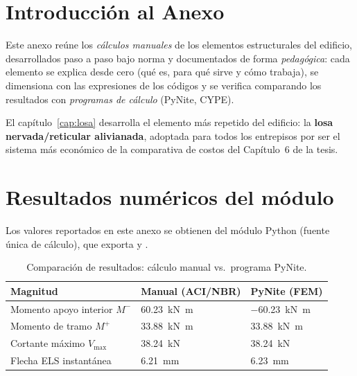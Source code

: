 





\tableofcontents
\listoffigures
\listoftables

\chapter{Introducción al Anexo}
\label{cap:intro}
Este anexo reúne los \emph{cálculos manuales} de los elementos
estructurales del edificio, desarrollados paso a paso bajo norma y
documentados de forma \emph{pedagógica}: cada elemento se explica desde
cero (qué es, para qué sirve y cómo trabaja), se dimensiona con las
expresiones de los códigos y se verifica comparando los resultados con
\emph{programas de cálculo} (PyNite, CYPE).

El capítulo~\ref{cap:losa} desarrolla el elemento más repetido del
edificio: la \textbf{losa nervada/reticular alivianada}, adoptada para
todos los entrepisos por ser el sistema más económico de la comparativa
de costos del Capítulo~6 de la tesis.




\appendix
\chapter{Resultados numéricos del módulo}
\label{cap:resultados}
Los valores reportados en este anexo se obtienen del módulo Python
 (fuente única de cálculo), que exporta
 y .

\begin{table}[H]
\centering
\caption{Comparación de resultados: cálculo manual vs.\ programa PyNite.}
\label{tab:comparacion}
\begin{tabular}{p{4.4cm}C{4.8cm}C{4.8cm}}
\toprule
\textbf{Magnitud} & \textbf{Manual (ACI/NBR)} & \textbf{PyNite (FEM)} \\
\midrule
Momento apoyo interior \(M^{-}\) & \SI{60,23}{\kilo\newton\meter} & \SI{-60,23}{\kilo\newton\meter} \\
Momento de tramo \(M^{+}\) & \SI{33,88}{\kilo\newton\meter} & \SI{33,88}{\kilo\newton\meter} \\
Cortante máximo \(V_{\max}\) & \SI{38,24}{\kilo\newton} & \SI{38,24}{\kilo\newton} \\
Flecha ELS instantánea & \SI{6,21}{\milli\meter} & \SI{6,23}{\milli\meter} \\
\bottomrule
\end{tabular}
\end{table}

